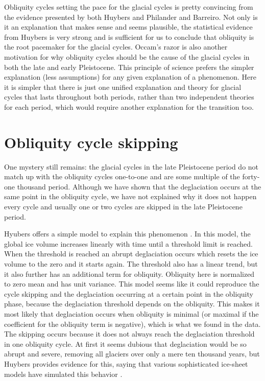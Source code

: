 \documentclass[11pt]{article}
\begin{document}
Obliquity cycles setting the pace for the glacial cycles is pretty convincing from the evidence presented by both Huybers and Philander and Barreiro.
Not only is it an explanation that makes sense and seems plausible, the statistical evidence from Huybers is very strong and is sufficient for us to conclude that obliquity is the root pacemaker for the glacial cycles.
Occam's razor is also another motivation for why obliquity cycles should be the cause of the glacial cycles in both the late and early Pleistocene.
This principle of science prefers the simpler explanation (less assumptions) for any given explanation of a phenomenon.
Here it is simpler that there is just one unified explanation and theory for glacial cycles that lasts throughout both periods, rather than two independent theories for each period, which would require another explanation for the transition too.

\section{Obliquity cycle skipping}
One mystery still remains: the glacial cycles in the late Pleistocene period do not match up with the obliquity cycles one-to-one and are some multiple of the forty-one thousand period.
Although we have shown that the deglaciation occurs at the same point in the obliquity cycle, we have not explained why it does not happen every cycle and usually one or two cycles are skipped in the late Pleistocene period.

Hyubers offers a simple model to explain this phenomenon \cite{huybers}.
In this model, the global ice volume increases linearly with time until a threshold limit is reached.
When the threshold is reached an abrupt deglaciation occurs which resets the ice volume to the zero and it starts again.
The threshold also has a linear trend, but it also further has an additional term for obliquity.
Obliquity here is normalized to zero mean and has unit variance.
This model seems like it could reproduce the cycle skipping and the deglaciation occurring at a certain point in the obliquity phase, because the deglaciation threshold depends on the obliquity.
This makes it most likely that deglaciation occurs when obliquity is minimal (or maximal if the coefficient for the obliquity term is negative), which is what we found in the data.
The skipping occurs because it does not always reach the deglaciation threshold in one obliquity cycle.
At first it seems dubious that deglaciation would be so abrupt and severe, removing all glaciers over only a mere ten thousand years, but Huybers provides evidence for this, saying that various sophisticated ice-sheet models have simulated this behavior \cite{huybers}.
\end{document}
